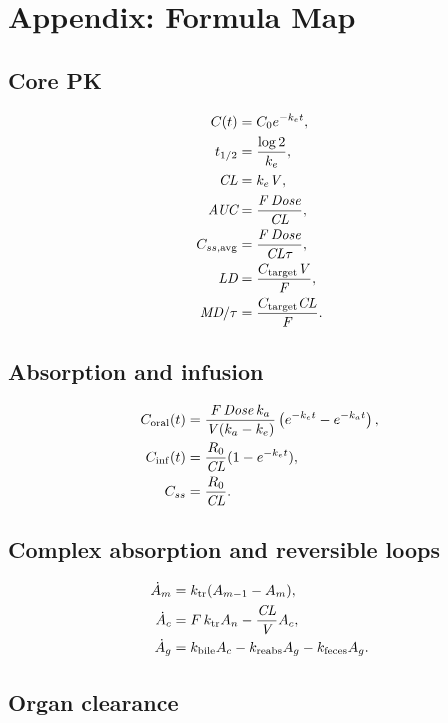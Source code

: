 \documentclass[a4paper]{article}
\newcommand{\pkCL}{\pksym{CL}}
\newcommand{\pkV}{\pksym{V}}
\newcommand{\pkF}{\pksym{F}}
\newcommand{\pkAUC}{\pksym{AUC}}
\newcommand{\pkCss}{C_{ss}}
\newcommand{\pkCavg}{C_{ss,\pklab{avg}}}
\begin{document}


\section{Appendix: Formula Map}

\subsection{Core PK}

\[
\begin{aligned}
C(t)&=C_0e^{-k_et},\\
t_{1/2}&=\frac{\log 2}{k_e},\\
\pkCL&=k_e\pkV,\\
\pkAUC&=\frac{\pkF\,\pksym{Dose}}{\pkCL},\\
\pkCavg&=\frac{\pkF\,\pksym{Dose}}{\pkCL\tau},\\
\pksym{LD}&=\frac{C_{\pklab{target}}\pkV}{\pkF},\\
\pksym{MD}/\tau&=\frac{C_{\pklab{target}}\pkCL}{\pkF}.
\end{aligned}
\]

\subsection{Absorption and infusion}

\[
\begin{aligned}
C_{\pklab{oral}}(t)
&=
\frac{\pkF\,\pksym{Dose}\,k_a}{\pkV(k_a-k_e)}
\left(e^{-k_et}-e^{-k_at}\right),\\
C_{\pklab{inf}}(t)
&=
\frac{R_0}{\pkCL}(1-e^{-k_et}),\\
\pkCss&=\frac{R_0}{\pkCL}.
\end{aligned}
\]

\subsection{Complex absorption and reversible loops}

\[
\begin{aligned}
\dot A_m&=k_{\pklab{tr}}(A_{m-1}-A_m),\\
\dot A_c&=F\,k_{\pklab{tr}}A_n-\frac{\pkCL}{\pkV}A_c,\\
\dot A_g&=k_{\pklab{bile}}A_c-k_{\pklab{reabs}}A_g-k_{\pklab{feces}}A_g.
\end{aligned}
\]

\subsection{Organ clearance}
\end{document}

